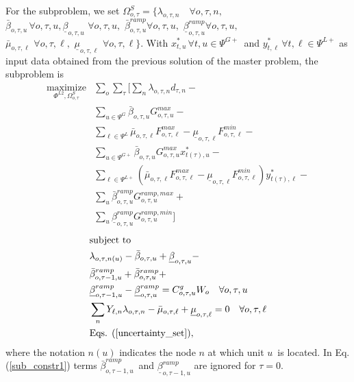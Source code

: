 For the subproblem, we set $\Omega^{S}_{o, \tau} = \{ \lambda_{o, \tau, n} \quad \forall o, \tau, n, $ $\bar{\beta}_{o, \tau, u} \, \forall o, \tau, u, \underline{\beta}_{o, \tau, u} \,\, \forall o, \tau, u, \,\, \bar{\beta}_{o, \tau, u}^{ramp} \forall o, \tau, u, \,\, \underline{\beta}_{o, \tau, u}^{ramp} \forall o, \tau, u,$ $\bar{\mu}_{o, \tau, \ell} \,\, \forall o, \tau, \ell, \,\, \underline{\mu}_{o, \tau, \ell} \,\, \forall o, \tau, \ell \}$. With $x_{t, u}^* \, \forall t, u \in \Psi^{G+}$ and $y_{t, \ell}^* \, \forall t, \ell \in \Psi^{L+}$ as input data obtained from the previous solution of the master problem, the subproblem is
\begin{align}
\label{sub_obj} \underset{\Phi^{L2}, \Omega_{o, \tau}^{S}}{\text{maximize}} &\sum\limits_o \sum\limits_{\tau} \Bigg[ \sum\limits_n \lambda_{o, \tau, n} d_{\tau, n} - \nonumber \\
&\sum\limits_{u \in \Psi^G} \bar{\beta}_{o, \tau, u} G_{o, \tau, u}^{max} - \nonumber \\
&\sum\limits_{\ell \in \Psi^L} \bar{\mu}_{o, \tau, \ell} F_{o, \tau, \ell}^{max} - \underline{\mu}_{o, \tau, \ell} F_{o, \tau, \ell}^{min} - \nonumber \\
&\sum\limits_{u \in \Psi^{G+}} \bar{\beta}_{o, \tau, u} G_{o, \tau, u}^{max} x_{t(\tau), u}^* - \nonumber \\
&\sum\limits_{\ell \in \Psi^{L+}} \left( \bar{\mu}_{o, \tau, \ell} F_{o, \tau, \ell}^{max} - \underline{\mu}_{o, \tau, \ell} F_{o, \tau, \ell}^{min} \right) y_{t(\tau), \ell}^* - \nonumber \\
&\sum\limits_{u} \bar{\beta}_{o, \tau, u}^{ramp} G^{ramp,max}_{o, \tau, u} + \nonumber \\
&\sum\limits_{u} \underline{\beta}_{o, \tau, u}^{ramp} G^{ramp,min}_{o, \tau, u} \Bigg]
\end{align}
\begin{align}
&\text{subject to} \nonumber \\
&\lambda_{o, \tau, n(u)} - \bar{\beta}_{o, \tau, u} + \underline{\beta}_{o, \tau, u} - \nonumber \\
&\bar{\beta}_{o, \tau - 1, u}^{ramp} + \bar{\beta}_{o, \tau, u}^{ramp} + \nonumber \\
&\label{sub_constr1}\underline{\beta}_{o, \tau - 1, u}^{ramp} - \underline{\beta}_{o, \tau, u}^{ramp} = C^g_{o, \tau, u}  W_o \quad \forall o, \tau, u \\
&\sum\limits_n Y_{\ell, n} \lambda_{o, \tau, n} - \bar{\mu}_{o, \tau, \ell} + \underline{\mu}_{o, \tau, \ell} = 0 \quad \forall o, \tau, \ell \\
&\text{Eqs. } (\ref{uncertainty_set}),
\end{align}
where the notation $n(u)$ indicates the node $n$ at which unit $u$ is located. In Eq. (\ref{sub_constr1}) terms $\bar{\beta}_{o, \tau - 1, u}^{ramp}$ and $\underline{\beta}_{o, \tau - 1, u}^{ramp}$ are ignored for $\tau = 0$.

